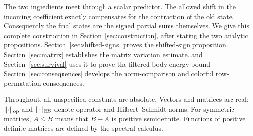 The two ingredients meet through a scalar predictor. The allowed shift
in the incoming coefficient exactly compensates for the contraction of
the old state. Consequently the final states are the signed partial
sums themselves. We give this complete construction in
Section~\ref{sec:construction}, after stating the two analytic
propositions. Section~\ref{sec:shifted-signs} proves the shifted-sign proposition.
Section~\ref{sec:matrix} establishes the matrix variation estimate, and
Section~\ref{sec:survival} uses it to prove the filtered-body energy bound.
Section~\ref{sec:consequences} develops the norm-comparison and colorful
row-permutation consequences.

Throughout, all unspecified constants are absolute. Vectors and matrices
are real; $\lVert\cdot\rVert_{\mathrm{op}}$ and $\lVert\cdot\rVert_{\mathrm{HS}}$ denote
operator and Hilbert--Schmidt norms. For symmetric matrices, $A\le B$
means that $B-A$ is positive semidefinite. Functions of positive definite
matrices are defined by the spectral calculus.
